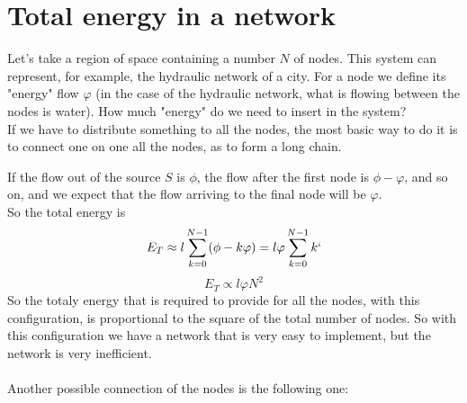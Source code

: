 \chapter{Total energy in a network}
Let's take a region of space containing a number $N$ of nodes. This system can represent, for example, the hydraulic network of a city. 
For a node we define its "energy" flow $\varphi$ (in the case of the hydraulic network, what is flowing between the nodes is water). How much "energy" do we need to insert in the system? \\
If we have to distribute something to all the nodes, the most basic way to do it is to connect one on one all the nodes, as to form a long chain. \\
\begin{center}
\end{center}
If the flow out of the source $S$ is $\phi$, the flow after the first node is $\phi - \varphi$, and so on, and we expect that the flow arriving to the final node will be $\varphi$. \\
So the total energy is 
$$
	E_T \approx l\sum_{k=0}^{N-1} (\phi - k\varphi) = l\varphi\sum_{k=0}^{N-1} k`
$$
$$
	E_T \propto l\varphi N^2
$$
So the totaly energy that is required to provide for all the nodes, with this configuration, is proportional to the square of the total number of nodes. So with this configuration we have a network that is very easy to implement, but the network is very inefficient. \\ \\ 
Another possible connection of the nodes is the following one:
\begin{center}
\end{center}
